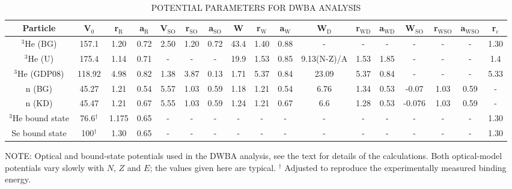 \begin{table}\footnotesize
{}
\caption[\uppercase{potential parameters for DWBA analysis}]{\\\label{tab:typicalPotentials} \uppercase{potential parameters for DWBA analysis}}
\begin{tabular}{ccccccccccccccccc}\toprule
Particle & V$_0$ & r$_{\text{R}}$ & a$_{\text{R}}$ & V$_{\text{SO}}$ & r$_{\text{SO}}$ & a$_{\text{SO}}$ & W & r$_{\text{W}}$ & a$_{\text{W}}$ & W$_{\text{D}}$ & r$_{\text{WD}}$ & a$_{\text{WD}}$ & W$_{\text{SO}}$ & r$_{\text{WSO}}$ & a$_{\text{WSO}}$ & r$_{\text{c}}$ \\
\midrule
$^{3}$He (BG) & 157.1 & 1.20 & 0.72 & 2.50 & 1.20 & 0.72 & 43.4 & 1.40 & 0.88 & - & - & - & - & - & - & 1.30\\
$^{3}$He (U) & 175.4 & 1.14 & 0.71 & - & - & - & 19.9 & 1.53 & 0.85 & 9.13(N-Z)/A & 1.53 & 1.85 & - & - & - & 1.4\\
$^{3}$He (GDP08) & 118.92 & 4.98 & 0.82 & 1.38 & 3.87 & 0.13 & 1.71 & 5.37 & 0.84 & 23.09 & 5.37 & 0.84 & - & - & - & 5.33\\

n (BG) & 45.27 & 1.21 & 0.54 & 5.57 & 1.03 & 0.59 & 1.18 & 1.21 & 0.54 & 6.76 & 1.34 & 0.53 & -0.07 & 1.03 & 0.59 & -\\
n (KD) & 45.47 & 1.21 & 0.67 & 5.55 & 1.03 & 0.59 & 1.24 & 1.21 & 0.67 & 6.6 & 1.28 & 0.53 & -0.076 & 1.03 & 0.59 & -\\

$^3$He bound state & 76.6$^{\dagger}$ & 1.175 & 0.65 & - & - & - & - & - & - & - & - & - & - & - & - & 1.30\\

Se bound state & 100$^{\dagger}$ & 1.30 & 0.65 & - & - & - & - & - & - & - & - & - & - & - & - & 1.30\\
\bottomrule
\end{tabular}
\begin{flushleft}
{\footnotesize NOTE:
Optical and bound-state potentials used in the DWBA analysis, see the text for details of the calculations. Both optical-model potentials vary slowly with $N$, $Z$ and $E$; the values given here are typical. $^{\dagger}$ Adjusted to reproduce the experimentally measured binding energy.}
\end{flushleft}
\end{table}
